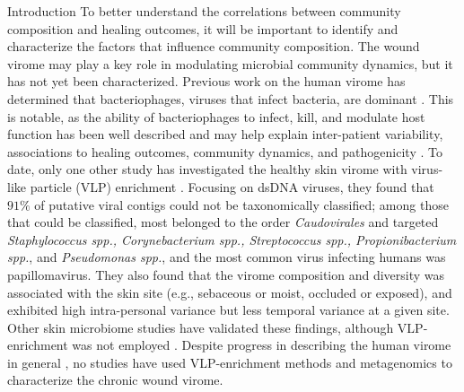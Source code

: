 \documentclass[oneside,12pt,final]{sty/ucthesis-CA2012}
\begin{document}
\begin{mainmatter}
\begin{section}{Introduction}
To better understand the correlations between community composition and healing outcomes, it will be important to identify and characterize the factors that influence community composition. The wound virome may play a key role in modulating microbial community dynamics, but it has not yet been characterized. Previous work on the human virome has determined that bacteriophages, viruses that infect bacteria, are dominant \cite{RN126, RN140}. This is notable, as the ability of bacteriophages to infect, kill, and modulate host function has been well described \cite{RN122, RN168, RN151} and may help explain inter-patient variability, associations to healing outcomes, community dynamics, and pathogenicity \cite{RN148, RN143, RN77, RN140}. To date, only one other study has investigated the healthy skin virome with virus-like particle (VLP) enrichment \cite{RN56}. Focusing on dsDNA viruses, they found that $91\%$ of putative viral contigs could not be taxonomically classified; among those that could be classified, most belonged to the order \textit{Caudovirales} and targeted \textit{Staphylococcus spp., Corynebacterium spp., Streptococcus spp., Propionibacterium spp.}, and \textit{Pseudomonas spp.}, and the most common virus infecting humans was papillomavirus. They also found that the virome composition and diversity was associated with the skin site (e.g., sebaceous or moist, occluded or exposed), and exhibited high intra-personal variance but less temporal variance at a given site. Other skin microbiome studies have validated these findings, although VLP-enrichment was not employed \cite{RN55, RN166}. Despite progress in describing the human virome in general \cite{RN126, RN142, RN140}, no studies have used VLP-enrichment methods and metagenomics to characterize the chronic wound virome.


\end{section}
\end{mainmatter}
\end{document}
